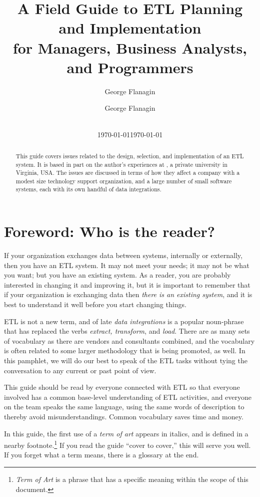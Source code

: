 \documentclass[11pt,letterpaper,twosided]{memoir}
\author{George Flanagin}
\date{\today}
\title{A Field Guide to ETL Planning and Implementation\\
\large for Managers, Business Analysts, and Programmers}
\author{George Flanagin\\
\normalsize\lit{gflanagin@richmond.edu}~\lit{me@georgeflanagin.com}}
\date{\today}
\begin{document}
\sloppybottom
\maketitle
\begin{abstract}
This guide covers issues related to the design, selection,
and implementation of an ETL system. It is based in part on the
author's experiences at \UR, a private university in Virginia, USA.
The issues are discussed in terms of how they affect a company
with a modest size technology support organization, and a large
number of small software systems, each with its own handful of 
data integrations. 
\end{abstract}
\newpage
\tableofcontents
\listoffigures
\newpage
\renewcommand\thelinenumber{\color{red}\arabic{linenumber}}
\pagewiselinenumbers
\switchlinenumbers*
\modulolinenumbers[3]

\frontmatter
\chapter{Foreword: Who is the reader?}
If your organization exchanges data between systems, internally or
externally, then you have an ETL system. It may not meet your needs;
it may not be what you want; but you have an existing system. As
a reader, you are probably interested in changing it and improving
it, but it is important to remember that if your organization is
exchanging data then \emph{there is an existing system}, and it is
best to understand it well before you start changing things.

ETL is not a new term, and of late \emph{data integrations} is a
popular noun-phrase that has replaced the verbs \emph{extract,
transform}, and \emph{load}.  There are as many sets of vocabulary as there
are vendors and consultants combined, and the vocabulary is often
related to some larger methodology that is being promoted, as well.
In this pamphlet, we will do our best to speak of the ETL tasks
without tying the conversation to any current or past point of view.

This guide should be read by everyone connected with
ETL so that everyone involved has a common base-level understanding
of ETL activities, and everyone on the team speaks the same language,
using the same words of description to thereby avoid misunderstandings.
Common vocabulary saves time and money.

In this guide,
the first use of a \emph{term of art} appears in italics, and is
defined in a nearby footnote.\footnote{\emph{Term of Art} is a
phrase that has a specific meaning within the scope of this document.}
If you read the guide ``cover to cover,'' this will serve you well. 
If you forget what a term means, there is a glossary at the end.
\end{document}
